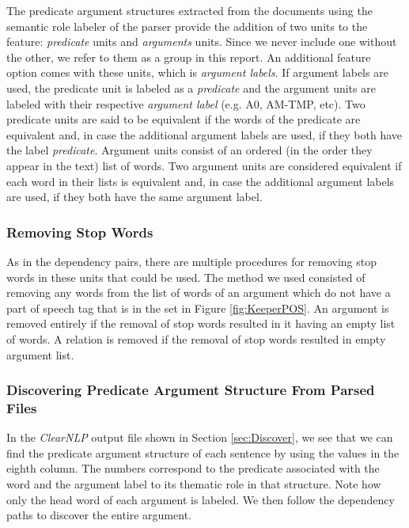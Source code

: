 \documentclass[11pt]{article}
\begin{document}
The predicate argument structures extracted from the documents using the semantic role labeler of the parser provide the addition of two units to the feature: \textit{predicate} units and \textit{arguments} units. Since we never include one without the other, we refer to them as a group in this report. An additional feature option comes with these units, which is \textit{argument labels}. If argument labels are used, the predicate unit is labeled as a \emph{predicate} and the argument units are labeled with their respective \emph{argument label} (e.g. A0, AM-TMP, etc). Two predicate units are said to be equivalent if the words of the predicate are equivalent and, in case the additional argument labels are used, if they both have the label \emph{predicate}. Argument units consist of an ordered (in the order they appear in the text) list of words. Two argument units are considered equivalent if each word in their lists is equivalent and, in case 
the additional argument labels are used, if they both have the same argument label. 

\subsubsection{Removing Stop Words}

As in the dependency pairs, there are multiple procedures for removing stop words in these units that could be used. The method we used consisted of removing any words from the list of words of an argument which do not have a part of speech tag that is in the set in Figure \ref{fig:KeeperPOS}. An argument is removed entirely if the removal of stop words resulted in it having an empty list of words. A relation is removed if the removal of stop words resulted in empty argument list. 

\subsubsection{Discovering Predicate Argument Structure From Parsed Files} 

In the \emph{ClearNLP} output file shown in Section \ref{sec:Discover}, we see that we can find the predicate argument structure of each sentence by using the values in the eighth column. The numbers correspond to the predicate associated with the word and the argument label to its thematic role in that structure. Note how only the head word of each argument is labeled. We then follow the dependency paths to discover the entire argument. 
\end{document}
